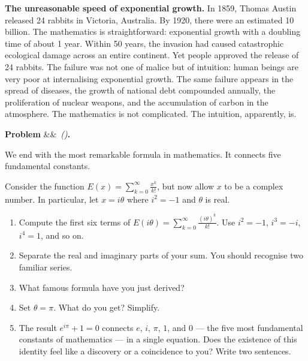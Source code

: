 \documentclass[12pt, a4paper]{article}
\newcounter{problem}
\newenvironment{problem}[1][]{%
  \refstepcounter{problem}%
  \par\vspace{6pt}%
  \noindent\textbf{\color{MidBlue}Problem \theproblem}%
  \ifx&#1&\else\ \textit{(#1)}\fi\textbf{.}\enskip
}{\par\vspace{4pt}}
\begin{document}
\begin{thought}
\textbf{The unreasonable speed of exponential growth.}
In 1859, Thomas Austin released 24 rabbits in Victoria, Australia. By 1920, there were an estimated 10 billion. The mathematics is straightforward: exponential growth with a doubling time of about 1 year. Within 50 years, the invasion had caused catastrophic ecological damage across an entire continent. Yet people approved the release of 24 rabbits. The failure was not one of malice but of intuition: human beings are very poor at internalising exponential growth. The same failure appears in the spread of diseases, the growth of national debt compounded annually, the proliferation of nuclear weapons, and the accumulation of carbon in the atmosphere. The mathematics is not complicated. The intuition, apparently, is.
\end{thought}

\begin{problem}
\label{prob:euler_identity}
We end with the most remarkable formula in mathematics. It connects five fundamental constants.

\medskip
Consider the function $E(x) = \displaystyle\sum_{k=0}^{\infty} \frac{x^k}{k!}$, but now allow $x$ to be a complex number. In particular, let $x = i\theta$ where $i^2 = -1$ and $\theta$ is real.

\begin{enumerate}[label=(\alph*), topsep=2pt]
  \item Compute the first six terms of $E(i\theta) = \sum_{k=0}^{\infty} \frac{(i\theta)^k}{k!}$. Use $i^2 = -1$, $i^3 = -i$, $i^4 = 1$, and so on.
  \item Separate the real and imaginary parts of your sum. You should recognise two familiar series.
  \item What famous formula have you just derived?
  \item Set $\theta = \pi$. What do you get? Simplify.
  \item The result $e^{i\pi} + 1 = 0$ connects $e$, $i$, $\pi$, $1$, and $0$ --- the five most fundamental constants of mathematics --- in a single equation. Does the existence of this identity feel like a discovery or a coincidence to you? Write two sentences.
\end{enumerate}
\end{problem}
\end{document}
